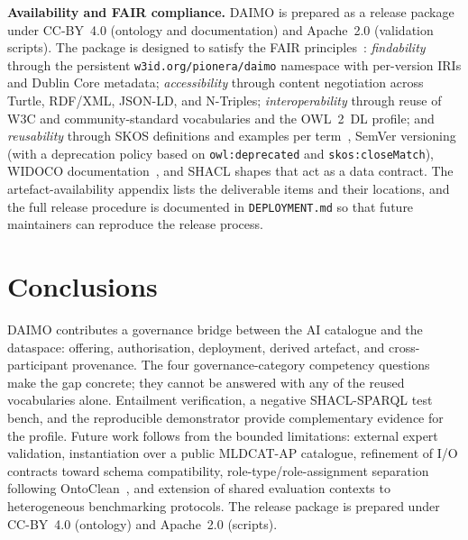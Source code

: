 \documentclass[Afour,sagev,times]{sagej}
\newcommand{\code}[1]{\texttt{#1}}
\begin{document}
\medskip
\noindent\textbf{Availability and FAIR compliance.}\label{sec:avail}
DAIMO is prepared as a release package under CC-BY~4.0 (ontology and documentation) and Apache~2.0 (validation scripts). The package is designed to satisfy the FAIR principles~\cite{fair}: \emph{findability} through the persistent \code{w3id.org/pionera/daimo} namespace with per-version IRIs and Dublin Core metadata; \emph{accessibility} through content negotiation across Turtle, RDF/XML, JSON-LD, and N-Triples; \emph{interoperability} through reuse of W3C and community-standard vocabularies and the OWL~2~DL profile; and \emph{reusability} through SKOS definitions and examples per term~\cite{skos}, SemVer versioning (with a deprecation policy based on \code{owl:deprecated} and \code{skos:closeMatch}), WIDOCO documentation~\cite{widoco}, and SHACL shapes that act as a data contract. The artefact-availability appendix lists the deliverable items and their locations, and the full release procedure is documented in \code{DEPLOYMENT.md} so that future maintainers can reproduce the release process.

\section{Conclusions}\label{sec:conclusion}

DAIMO contributes a governance bridge between the AI catalogue and the dataspace: offering, authorisation, deployment, derived artefact, and cross-participant provenance. The four governance-category competency questions make the gap concrete; they cannot be answered with any of the reused vocabularies alone. Entailment verification, a negative SHACL-SPARQL test bench, and the reproducible demonstrator provide complementary evidence for the profile. Future work follows from the bounded limitations: external expert validation, instantiation over a public MLDCAT-AP catalogue, refinement of I/O contracts toward schema compatibility, role-type/role-assignment separation following OntoClean~\cite{ontoclean}, and extension of shared evaluation contexts to heterogeneous benchmarking protocols. The release package is prepared under CC-BY~4.0 (ontology) and Apache~2.0 (scripts).
\end{document}
